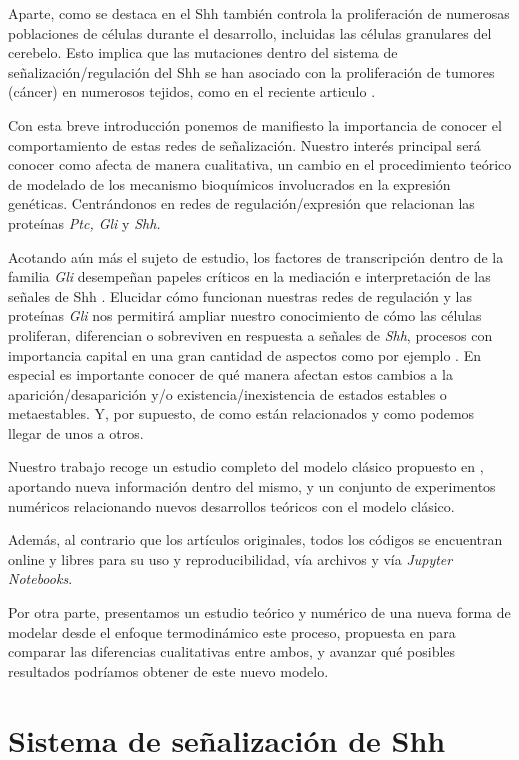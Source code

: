 Aparte, como se destaca en \cite{schaffer} el Shh también
controla la proliferación de numerosas poblaciones de células durante el desarrollo, incluidas las células granulares del cerebelo. Esto implica que las mutaciones dentro del sistema de señalización/regulación del Shh se han asociado con la proliferación de tumores (cáncer) en numerosos tejidos, como en el reciente articulo \cite{clement2007hedgehog}.

Con esta breve introducción ponemos de manifiesto la importancia de conocer el comportamiento de estas redes de señalización. Nuestro interés principal será conocer como afecta de manera cualitativa, un cambio en el procedimiento teórico de modelado de los mecanismo bioquímicos involucrados en la expresión genéticas. Centrándonos en redes de regulación/expresión que relacionan las proteínas\textit{ Ptc, Gli} y \textit{Shh.}

Acotando aún más el sujeto de estudio, los factores de transcripción dentro de la familia \textit{Gli} desempeñan papeles críticos en la mediación e interpretación de las señales de Shh \cite{i1999proteins}. Elucidar cómo funcionan nuestras redes de regulación y las proteínas \textit{Gli} nos permitirá ampliar nuestro conocimiento de cómo las células proliferan, diferencian o sobreviven en respuesta a señales de \textit{Shh}, procesos con importancia capital en una gran cantidad de aspectos como por ejemplo \cite{dahmane1997activation}. En especial es importante conocer de qué manera afectan estos cambios a la aparición/desaparición y/o existencia/inexistencia de estados estables o metaestables. Y, por supuesto, de como están relacionados y como podemos llegar de unos a otros. 
 
 Nuestro trabajo recoge un estudio completo del modelo clásico propuesto en \cite{schaffer}, aportando nueva información dentro del mismo, y un conjunto de experimentos numéricos relacionando nuevos desarrollos teóricos con el modelo clásico. 
 
 Además, al contrario que los artículos originales, todos los códigos se encuentran online y libres para su uso y reproducibilidad, vía archivos y vía \textit{Jupyter Notebooks}.
 
 Por otra parte, presentamos un estudio teórico y numérico de una nueva forma de modelar desde el enfoque termodinámico este proceso, propuesta en \cite{multiple} para comparar las diferencias cualitativas entre ambos, y avanzar qué posibles resultados podríamos obtener de este nuevo modelo. 
 
 \section{Sistema de señalización de Shh}
 
